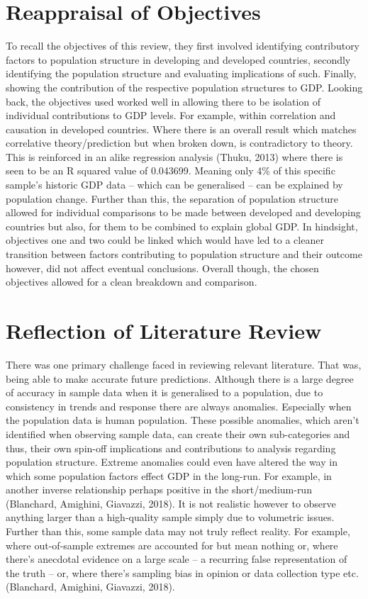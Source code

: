 \documentclass[11pt, english]{article}
\begin{document}
\newpage

\section{Reappraisal of Objectives}

	To recall the objectives of this review, they first involved identifying contributory factors to population structure in developing and developed countries, secondly identifying the population structure and evaluating implications of such. Finally, showing the contribution of the respective population structures to GDP.  Looking back, the objectives used worked well in allowing there to be isolation of individual contributions to GDP levels. For example, within correlation and causation in developed countries. Where there is an overall result which matches correlative theory/prediction but when broken down, is contradictory to theory. This is reinforced in an alike regression analysis (Thuku, 2013) where there is seen to be an R squared value of 0.043699. Meaning only 4\% of this specific sample's historic GDP data – which can be generalised – can be explained by population change. Further than this, the separation of population structure allowed for individual comparisons to be made between developed and developing countries but also, for them to be combined to explain global GDP. In hindsight, objectives one and two could be linked which would have led to a cleaner transition between factors contributing to population structure and their outcome however, did not affect eventual conclusions. Overall though, the chosen objectives allowed for a clean breakdown and comparison.

\newpage

\section{Reflection of Literature Review}

	There was one primary challenge faced in reviewing relevant literature. That was, being able to make accurate future predictions. Although there is a large degree of accuracy in sample data when it is generalised to a population, due to consistency in trends and response there are always anomalies. Especially when the population data is human population. These possible anomalies, which aren't identified when observing sample data, can create their own sub-categories and thus, their own spin-off implications and contributions to analysis regarding population structure. Extreme anomalies could even have altered the way in which some population factors effect GDP in the long-run. For example, in another inverse relationship perhaps positive in the short/medium-run (Blanchard, Amighini, Giavazzi, 2018). It is not realistic however to observe anything larger than a high-quality sample simply due to volumetric issues. Further than this, some sample data may not truly reflect reality. For example, where out-of-sample extremes are accounted for but mean nothing or, where there's anecdotal evidence on a large scale – a recurring false representation of the truth – or, where there's sampling bias in opinion or data collection type etc. (Blanchard, Amighini, Giavazzi, 2018).\\
\end{document}
